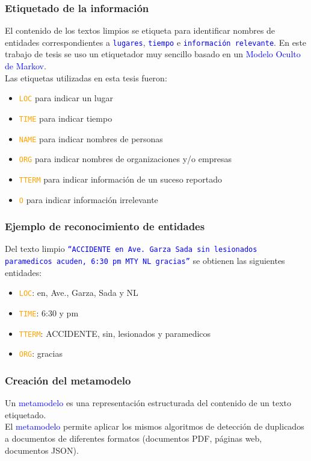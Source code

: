 \documentclass{beamer}
\begin{document}
\begin{frame}
  \frametitle{Etiquetado de la informaci\'{o}n}
  El contenido de los textos limpios se etiqueta para identificar nombres de entidades correspondientes a \textcolor{blue}{\texttt{lugares}}, \textcolor{blue}{\texttt{tiempo}} e \textcolor{blue}{\texttt{informaci\'{o}n relevante}}. En este trabajo de tesis se uso un etiquetador muy sencillo basado en un \textcolor{blue}{Modelo Oculto de Markov}.
  \vspace{2 mm}\\
  Las etiquetas utilizadas en esta tesis fueron:
  \vspace{2 mm}
  \begin{itemize}
  \item \texttt{\textcolor{orange}{LOC}} para indicar un lugar
  \item \texttt{\textcolor{orange}{TIME}} para indicar tiempo
  \item \texttt{\textcolor{orange}{NAME}} para indicar nombres de personas
  \item \texttt{\textcolor{orange}{ORG}} para indicar nombres de organizaciones y/o empresas
  \item \texttt{\textcolor{orange}{TTERM}} para indicar informaci\'{o}n de un suceso reportado
  \item \texttt{\textcolor{orange}{O}} para indicar informaci\'{o}n irrelevante
  \end{itemize}
\end{frame}

\begin{frame}
  \frametitle{Ejemplo de reconocimiento de entidades}
  Del texto limpio \textcolor{blue}{\texttt{``ACCIDENTE en Ave. Garza Sada sin lesionados paramedicos acuden, 6:30 pm MTY NL gracias''}} se obtienen las siguientes entidades:\\
  \begin{itemize}
    \item \textcolor{orange}{\texttt{LOC}}: en, Ave., Garza, Sada y NL 
    \item \textcolor{orange}{\texttt{TIME}}: 6:30 y pm
    \item \textcolor{orange}{\texttt{TTERM}}: ACCIDENTE, sin, lesionados y paramedicos
    \item \textcolor{orange}{\texttt{ORG}}: gracias
  \end{itemize}
\end{frame}

\begin{frame}
  \frametitle{Creaci\'{o}n del metamodelo}
  Un \textcolor{blue}{metamodelo} es una representaci\'{o}n estructurada del contenido de un texto etiquetado.\\
  El \textcolor{blue}{metamodelo} permite aplicar los mismos algoritmos de detecci\'{o}n de duplicados a documentos de diferentes formatos (documentos PDF, p\'{a}ginas web, documentos JSON).\\
  
  
\end{frame}
\end{document}
